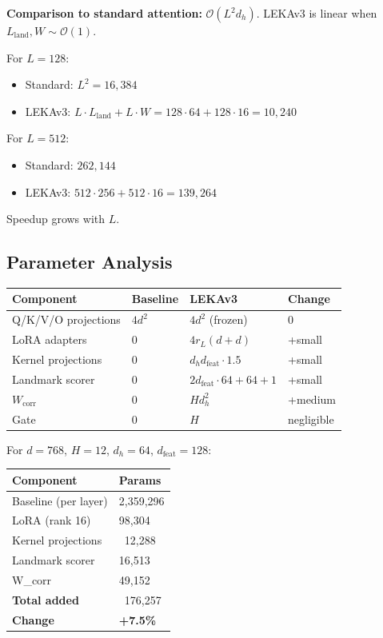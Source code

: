 \textbf{Comparison to standard attention:} $\mathcal{O}(L^2 d_h)$. LEKAv3 is linear 
when $L_\text{land}, W \sim \mathcal{O}(1)$.

For $L = 128$:
\begin{itemize}
\item Standard: $L^2 = 16{,}384$
\item LEKAv3: $L \cdot L_\text{land} + L \cdot W = 128 \cdot 64 + 128 \cdot 16 = 10{,}240$

\end{itemize}
For $L = 512$:
\begin{itemize}
\item Standard: $262{,}144$
\item LEKAv3: $512 \cdot 256 + 512 \cdot 16 = 139{,}264$

\end{itemize}
Speedup grows with $L$.

\subsection{Parameter Analysis}

\begin{table}[H]
\centering
\small
\begin{tabular}{llll}
\toprule
\textbf{Component} & \textbf{Baseline} & \textbf{LEKAv3} & \textbf{Change} \\
\midrule
Q/K/V/O projections & $4 d^2$ & $4 d^2$ (frozen) & 0 \\
LoRA adapters & 0 & $4 r_L (d + d)$ & +small \\
Kernel projections & 0 & $d_h d_\text{feat} \cdot 1.5$ & +small \\
Landmark scorer & 0 & $2 d_\text{feat} \cdot 64 + 64 + 1$ & +small \\
$W_\text{corr}$ & 0 & $H d_h^2$ & +medium \\
Gate & 0 & $H$ & negligible \\
\bottomrule
\end{tabular}
\end{table}

For $d = 768$, $H = 12$, $d_h = 64$, $d_\text{feat} = 128$:

\begin{table}[H]
\centering
\small
\begin{tabular}{ll}
\toprule
\textbf{Component} & \textbf{Params} \\
\midrule
Baseline (per layer) & 2,359,296 \\
LoRA (rank 16) & 98,304 \\
Kernel projections & ~12,288 \\
Landmark scorer & 16,513 \\
W\_corr & 49,152 \\
\textbf{Total added} & ~176,257 \\
\textbf{Change} & \textbf{+7.5\%} \\
\bottomrule
\end{tabular}
\end{table}

